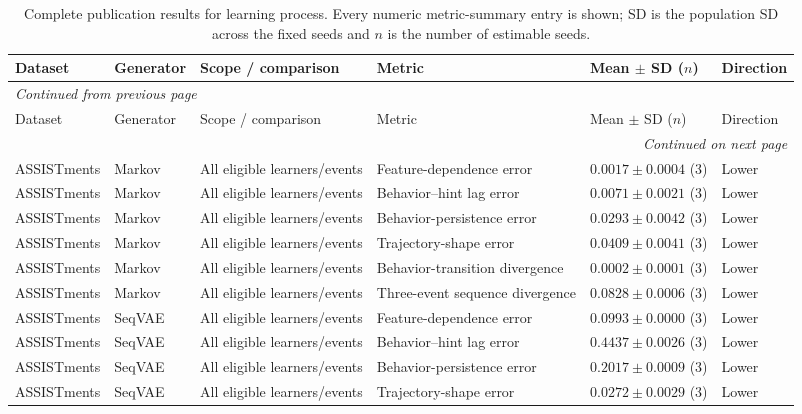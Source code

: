 \scriptsize
\setlength{\tabcolsep}{3pt}
\begin{longtable}{@{}p{2.25cm}p{2.05cm}p{4.7cm}p{5.0cm}p{2.6cm}p{1.25cm}@{}}
\caption{Complete publication results for learning process. Every numeric metric-summary entry is shown; SD is the population SD across the fixed seeds and $n$ is the number of estimable seeds.}\label{tab:supp-learning-process}\\
\toprule
Dataset & Generator & Scope / comparison & Metric & Mean $\pm$ SD ($n$) & Direction \\
\midrule
\endfirsthead
\multicolumn{6}{l}{\textit{Continued from previous page}}\\
\toprule
Dataset & Generator & Scope / comparison & Metric & Mean $\pm$ SD ($n$) & Direction \\
\midrule
\endhead
\midrule
\multicolumn{6}{r}{\textit{Continued on next page}}\\
\endfoot
\bottomrule
\endlastfoot
ASSISTments & Markov & All eligible learners/events & Feature-dependence error & $0.0017 \mathbin{\pm} 0.0004$ (3) & Lower \\
ASSISTments & Markov & All eligible learners/events & Behavior--hint lag error & $0.0071 \mathbin{\pm} 0.0021$ (3) & Lower \\
ASSISTments & Markov & All eligible learners/events & Behavior-persistence error & $0.0293 \mathbin{\pm} 0.0042$ (3) & Lower \\
ASSISTments & Markov & All eligible learners/events & Trajectory-shape error & $0.0409 \mathbin{\pm} 0.0041$ (3) & Lower \\
ASSISTments & Markov & All eligible learners/events & Behavior-transition divergence & $0.0002 \mathbin{\pm} 0.0001$ (3) & Lower \\
ASSISTments & Markov & All eligible learners/events & Three-event sequence divergence & $0.0828 \mathbin{\pm} 0.0006$ (3) & Lower \\
ASSISTments & SeqVAE & All eligible learners/events & Feature-dependence error & $0.0993 \mathbin{\pm} 0.0000$ (3) & Lower \\
ASSISTments & SeqVAE & All eligible learners/events & Behavior--hint lag error & $0.4437 \mathbin{\pm} 0.0026$ (3) & Lower \\
ASSISTments & SeqVAE & All eligible learners/events & Behavior-persistence error & $0.2017 \mathbin{\pm} 0.0009$ (3) & Lower \\
ASSISTments & SeqVAE & All eligible learners/events & Trajectory-shape error & $0.0272 \mathbin{\pm} 0.0029$ (3) & Lower \\

\end{longtable}
